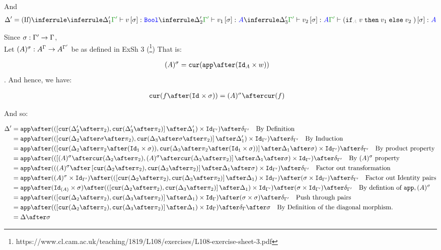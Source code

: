 \documentclass{report}
\begin{document}
And
\begin{equation}
    \D' = \ntreeruleIII{If}{\treeruleI{\D_1'}{\typerelation{\G'}{v\ssi}{\B}}}{\treeruleI{\D_2'}{\typerelation{\G'}{v_1\ssi}{ A}}}{\treeruleI{\D_3'}{\typerelation{\G'}{v_2\ssi}{ A}}}{\typerelation{\G'}{(\pifthenelse{A}{v}{v_1}{v_2})\ssi}{ A}}
\end{equation}

Since $\sigma: \Gamma' \rightarrow \Gamma$, \\
Let $(A)^{\sigma}: A^{\Gamma}\rightarrow A^{\Gamma'}$ be as defined in ExSh 3 (\footnote{https://www.cl.cam.ac.uk/teaching/1819/L108/exercises/L108-exercise-sheet-3.pdf})
That is:

\begin{align}
    ( A)^{\si} & = \cur{\app\after(\Id{ A}\times w)}
\end{align}.
And hence, we have:

\begin{align}
    \cur{f\after(\Id{}\times \si)} & = ( A)^{\si} \after\cur{f}
\end{align}

And so:

\begin{align}
    \D' & =\app\after((\fld{\cur{\D_2'\after\pp}}{\cur{\D_3'\after\pp}}\after\D_1')\times \Id{\G'})\after\diag{\G'}\qt{By Definition}\\
    & =\app\after((\fld{\cur{\D_2\after\si\after\pp}}{\cur{\D_3\after\si\after\pp}}\after\D_1')\times \Id{\G'})\after\diag{\G'}\qt{By Induction}\\
    & = \app\after((\fld{\cur{\D_2\after\pp\after(\Id{\1}\times \si)}}{\cur{\D_3\after\pp\after(\Id{\1}\times \si)}}\after\D_1\after\si)\times \Id{\G'})\after\diag{\G'}\qt{By product property}\\
    & = \app\after((\fld{( A)^{\si}\after\cur{\D_2\after\pp}}{( A)^{\si}\after\cur{\D_3\after\pp}}\after\D_1\after\si)\times \Id{\G'})\after\diag{\G'}\qt{By $( A)^{\si}$ property}\\
    & = \app\after((( A)^{\si}\after\fld{\cur{\D_2\after\pp}}{\cur{\D_3\after\pp}}\after\D_1\after\si)\times \Id{\G'})\after\diag{\G'}\qt{Factor out transformation}\\
    & = \app\after(( A)^{\si}\times\Id{\G'})\after((\fld{\cur{\D_2\after\pp}}{\cur{\D_3\after\pp}}\after\D_1)\times \Id{\G'})\after(\si \times \Id{\G'})\after\diag{\G'}\qt{Factor out Identity pairs}\\
    & = \app\after(\Id{( A)}\times\si)\after((\fld{\cur{\D_2\after\pp}}{\cur{\D_3\after\pp}}\after\D_1) \times \Id{\G'})\after(\si \times \Id{\G'})\after\diag{\G'}\qt{By defintion of $\app, ( A)^{\si}$}\\
    & = \app\after((\fld{\cur{\D_2\after\pp}}{\cur{\D_3\after\pp}}\after\D_1)\times \idg)\after(\si \times \si)\after\diag{\G'}\qt{Push through pairs}\\
    & = \app\after((\fld{\cur{\D_2\after\pp}}{\cur{\D_3\after\pp}}\after\D_1)\times \idg)\after\diag{\G}\after\si\qt{By Definition of the diagonal morphism.}\\
    & = \D\after\si
\end{align}
\end{document}

